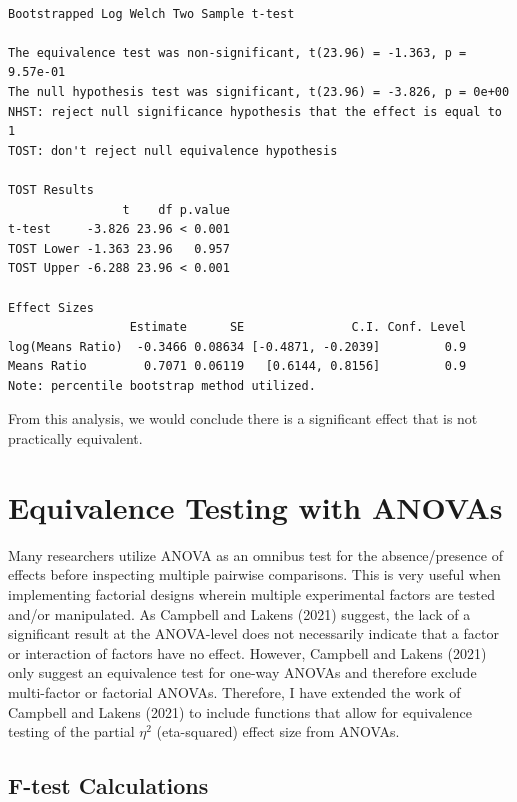 \documentclass[
]{interact}
\begin{document}
\begin{verbatim}

Bootstrapped Log Welch Two Sample t-test

The equivalence test was non-significant, t(23.96) = -1.363, p = 9.57e-01
The null hypothesis test was significant, t(23.96) = -3.826, p = 0e+00
NHST: reject null significance hypothesis that the effect is equal to 1 
TOST: don't reject null equivalence hypothesis

TOST Results 
                t    df p.value
t-test     -3.826 23.96 < 0.001
TOST Lower -1.363 23.96   0.957
TOST Upper -6.288 23.96 < 0.001

Effect Sizes 
                 Estimate      SE               C.I. Conf. Level
log(Means Ratio)  -0.3466 0.08634 [-0.4871, -0.2039]         0.9
Means Ratio        0.7071 0.06119   [0.6144, 0.8156]         0.9
Note: percentile bootstrap method utilized.
\end{verbatim}

From this analysis, we would conclude there is a significant effect that
is not practically equivalent.

\newpage

\hypertarget{equivalence-testing-with-anovas}{%
\section{Equivalence Testing with
ANOVAs}\label{equivalence-testing-with-anovas}}

Many researchers utilize ANOVA as an omnibus test for the
absence/presence of effects before inspecting multiple pairwise
comparisons. This is very useful when implementing factorial designs
wherein multiple experimental factors are tested and/or manipulated. As
Campbell and Lakens (2021) suggest, the lack of a significant result at
the ANOVA-level does not necessarily indicate that a factor or
interaction of factors have no effect. However, Campbell and Lakens
(2021) only suggest an equivalence test for one-way ANOVAs and therefore
exclude multi-factor or factorial ANOVAs. Therefore, I have extended the
work of Campbell and Lakens (2021) to include functions that allow for
equivalence testing of the partial \(\eta^2\) (eta-squared) effect size
from ANOVAs.

\hypertarget{f-test-calculations}{%
\subsection{F-test Calculations}\label{f-test-calculations}}
\end{document}
